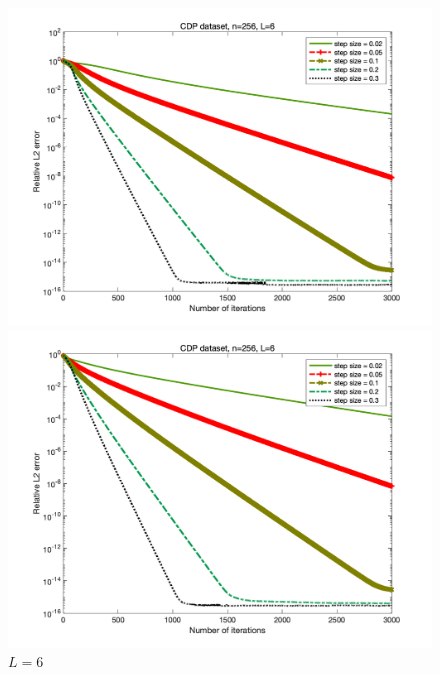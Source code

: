 \documentclass{article}
\begin{document}
\begin{figure}
	\begin{minipage}{0.33\linewidth}
		\centering
		\includegraphics[width=1\linewidth]{./fig/CDP+21.png}
		\caption{$L=3$}
	\end{minipage}
	\begin{minipage}{0.33\linewidth}
		\centering
		\includegraphics[width=1\linewidth]{./fig/CDP+22.png}
		\caption{$L=6$}
	\end{minipage}
	\begin{minipage}{0.33\linewidth}
		\centering

\end{minipage}
\end{figure}
\end{document}
